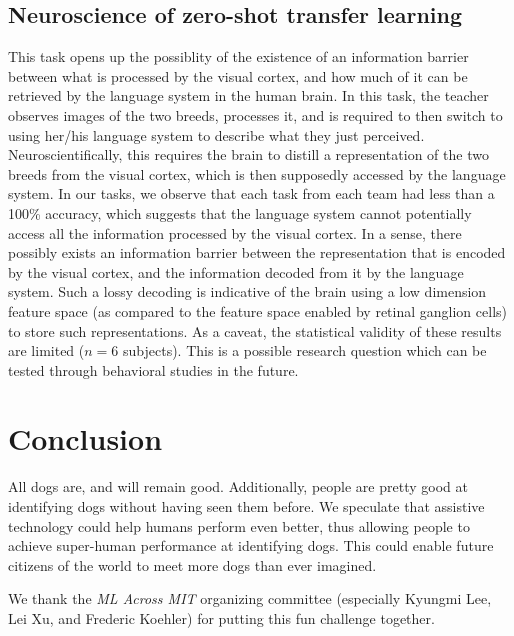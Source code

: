 \documentclass[sigplan,10pt]{acmart}
\begin{document}
\subsection{Neuroscience of zero-shot transfer learning}
This task opens up the possiblity of the existence of an information barrier between what is processed by the visual cortex, and how much of it can be retrieved by the language system in the human brain. In this task, the teacher observes images of the two breeds, processes it, and is required to then switch to using her/his language system to describe what they just perceived. Neuroscientifically, this requires the brain to distill a representation of the two breeds from the visual cortex, which is then supposedly accessed by the language system. In our tasks, we observe that each task from each team had less than a 100\% accuracy, which suggests that the language system cannot potentially access all the information processed by the visual cortex. In a sense, there possibly exists an information barrier between the representation that is encoded by the visual cortex, and the information decoded from it by the language system. Such a lossy decoding is indicative of the brain using a low dimension feature space (as compared to the feature space enabled by retinal ganglion cells) to store such representations. As a caveat, the statistical validity of these results are limited ($n=6$ subjects). This is a possible research question which can be tested through behavioral studies in the future.

\section{Conclusion}

All dogs are, and will remain good. Additionally, people are pretty good at identifying dogs without having seen them before. We speculate that assistive technology could help humans perform even better, thus allowing people to achieve super-human performance at identifying dogs. This could enable future citizens of the world to meet more dogs than ever imagined.



\begin{acks}
We thank the \textit{ML Across MIT} organizing committee (especially Kyungmi Lee, Lei Xu, and Frederic Koehler) for putting this fun challenge together.

\end{acks}



\end{document}
